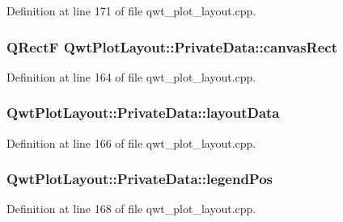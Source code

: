 Definition at line 171 of file qwt\-\_\-plot\-\_\-layout.\-cpp.

\hypertarget{class_qwt_plot_layout_1_1_private_data_a8000e73823398884b71c159c56c08cf0}{
\subsubsection[{canvas\-Rect}]{\setlength{\rightskip}{0pt plus 5cm}Q\-Rect\-F Qwt\-Plot\-Layout\-::\-Private\-Data\-::canvas\-Rect}}\label{class_qwt_plot_layout_1_1_private_data_a8000e73823398884b71c159c56c08cf0}


Definition at line 164 of file qwt\-\_\-plot\-\_\-layout.\-cpp.

\hypertarget{class_qwt_plot_layout_1_1_private_data_a75b20a0499afd289035cfc0bdf73bf85}{
\subsubsection[{layout\-Data}]{ Qwt\-Plot\-Layout\-::\-Private\-Data\-::layout\-Data}}\label{class_qwt_plot_layout_1_1_private_data_a75b20a0499afd289035cfc0bdf73bf85}


Definition at line 166 of file qwt\-\_\-plot\-\_\-layout.\-cpp.

\hypertarget{class_qwt_plot_layout_1_1_private_data_a7491407e8f2b7c402c1d8b2f1c10403b}{
\subsubsection[{legend\-Pos}]{ Qwt\-Plot\-Layout\-::\-Private\-Data\-::legend\-Pos}}\label{class_qwt_plot_layout_1_1_private_data_a7491407e8f2b7c402c1d8b2f1c10403b}


Definition at line 168 of file qwt\-\_\-plot\-\_\-layout.\-cpp.

